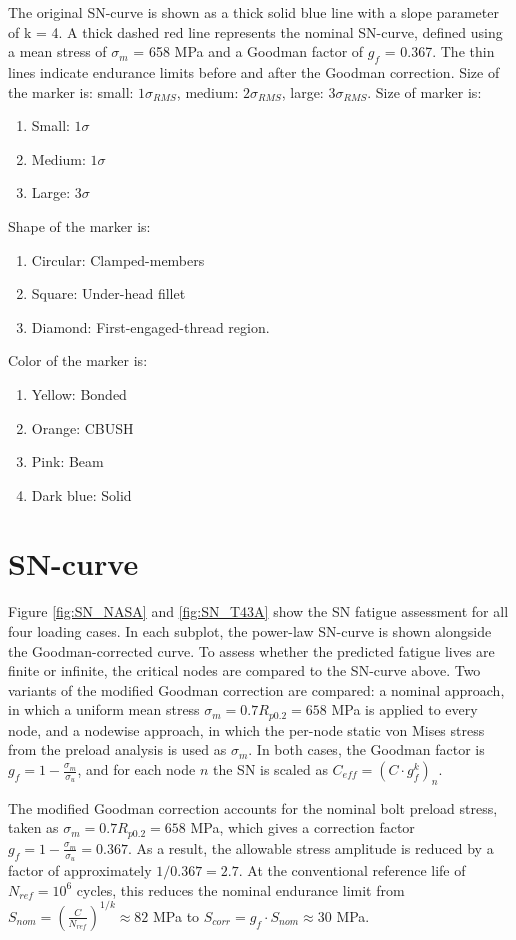 \documentclass[a4paper,twoside]{bth}
\begin{document}
The original SN-curve is shown as a thick solid blue line with a slope parameter of k = 4. A thick dashed red line represents the nominal SN-curve, defined using a mean stress of $\sigma_m$ = 658 MPa and a Goodman factor of $g_f$ = 0.367. The thin lines indicate endurance limits before and after the Goodman correction.
Size of the marker is: small: $1\sigma_{RMS}$, medium: $2\sigma_{RMS}$, large: $3\sigma_{RMS}$.
Size of marker is:
\begin{enumerate}
    \item Small: $1\sigma$
    \item Medium: $1\sigma$
    \item Large: $3\sigma$
\end{enumerate}
Shape of the marker is: 
\begin{enumerate}
    \item Circular: Clamped-members
    \item Square: Under-head fillet
    \item Diamond: First-engaged-thread region.
\end{enumerate}
Color of the marker is:
\begin{enumerate}
    \item Yellow: Bonded
    \item Orange: CBUSH
    \item Pink: Beam
    \item Dark blue: Solid
\end{enumerate}


\chapter{SN-curve} \label{app:SN-curve}
Figure \ref{fig:SN_NASA} and \ref{fig:SN_T43A} show the SN fatigue assessment for all four loading cases. In each subplot, the power-law SN-curve is shown alongside the Goodman-corrected curve. To assess whether the predicted fatigue lives are finite or infinite, the critical nodes are compared to the SN-curve above. Two variants of the modified Goodman correction are compared: a nominal approach, in which a uniform mean stress $\sigma_m = 0.7 R_{p0.2} = 658$ MPa is applied to every node, and a nodewise approach, in which the per-node static von Mises stress from the preload analysis is used as $\sigma_m$. In both cases, the Goodman factor is $g_f = 1- \tfrac{\sigma_m}{\sigma_u}$, and for each node $n$ the SN is scaled as $C_{eff} = (C\cdot g_f^k)_n$.

The modified Goodman correction accounts for the nominal bolt preload stress, taken as $\sigma_m = 0.7 R_{p0.2} = 658$ MPa, which gives a correction factor $g_f = 1- \tfrac{\sigma_m}{\sigma_u} = 0.367$. As a result, the allowable stress amplitude is reduced by a factor of approximately $1/0.367 = 2.7$. At the conventional reference life of $N_{ref} = 10^6$ cycles, this reduces the nominal endurance limit from $S_{nom} = (\tfrac{C}{N_{ref}})^{1/k} \approx 82$ MPa to $S_{corr} = g_f \cdot S_{nom} \approx 30$ MPa.
\end{document}
